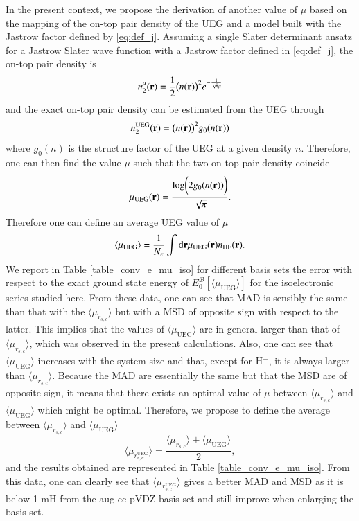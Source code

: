 \documentclass[aip,jcp,reprint,noshowkeys,superscriptaddress]{revtex4-1}
\newcommand{\basis}[0]{\mathcal{B}}
\newcommand{\muueg}{\mu_{\text{UEG}}}
\newcommand{\muuegav}{\langle \mu_{\text{UEG}}\rangle}
\newcommand{\murscav}{\langle \mu_{r_{s,c}}\rangle}
\newcommand{\mursclda}{\langle \mu_{r_{s,c}^{\text{UEG}}}\rangle}
\begin{document}
In the present context, we propose the derivation of another value of $\mu$ based on the mapping of the on-top pair density of the UEG and a model built with the Jastrow factor defined by \eqref{eq:def_j}. 
Assuming a single Slater determinant ansatz for a Jastrow Slater wave function with a Jastrow factor defined in \eqref{eq:def_j}, the on-top pair density is 
\begin{equation}
 n_2^\mu({\bf r}) = \frac{1}{2}\big(n({\bf r})\big)^2 e^{-\frac{1}{\sqrt{\pi}\mu}}
\end{equation}
and the exact on-top pair density can be estimated from the UEG through 
\begin{equation}
 n_2^{\text{UEG}}({\bf r}) = \big(n({\bf r})\big)^2g_0(n({\bf r}))
\end{equation}
where $g_0( n)$ is the structure factor of the UEG at a given density $n$. 
Therefore, one can then find the value $\mu$ such that the two on-top pair density coincide
\begin{equation}
 \muueg({\bf r}) = \frac{\text{log}\bigg(2 g_0(n({\bf r}))\bigg) }{\sqrt{\pi}}.
\end{equation}
Therefore one can define an average UEG value of $\mu$ 
\begin{equation}
 \label{eq:mu_av_ueg}
 \muuegav = \frac{1}{N_e}\int \text{d}{\bf r} \muueg({\bf r}) n_{\text{HF}}({\bf r}).
\end{equation}
We report in Table \ref{table_conv_e_mu_iso} for different basis sets the error with respect to the exact ground state energy of $E_0^{\basis}[\muuegav]$ for the isoelectronic series studied here. 
From these data, one can see that MAD is sensibly the same than that with the $\murscav$ but with a MSD of opposite sign with respect to the latter. This implies that the values of $\muuegav$ are in general larger than that of $\murscav$, which was observed in the present calculations. 
Also, one can see that $ \muuegav$ increases with the system size and that, except for H$^-$, it is always larger than $\murscav$. 
Because the MAD are essentially the same but that the MSD are of opposite sign, it means that there exists an optimal value of $\mu$ between $\murscav$ and $\muuegav$ which might be optimal. 
Therefore, we propose to define the average between $\murscav$ and $\muuegav$ 
\begin{equation}
 \label{eq:mu_av_ueg_rsc}
  \mursclda = \frac{\murscav   +   \muuegav }{2},
\end{equation}
and the results obtained are represented in Table \ref{table_conv_e_mu_iso}. From this data, one can clearly see that $\mursclda$ gives a better MAD and MSD as it is below 1 mH from the aug-cc-pVDZ basis set and still improve when enlarging the basis set. 
\end{document}
